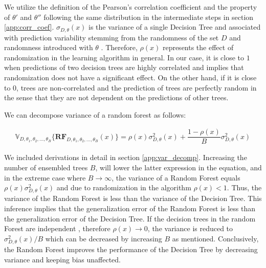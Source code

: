 We utilize the definition of the Pearson's correlation coefficient and the property of $\theta'$ and $\theta''$ following 
the same distribution in the intermediate steps in section \ref{app:corr_coef}. 
$\sigma_{D, \theta}(x)$ is the variance of a single Decision Tree and 
associated with prediction variability stemming from the randomness of the set $D$ 
and randomness introduced with $\theta$ \cite{louppe2014understanding}.
Therefore, $\rho(x)$ represents the effect of randomization in the learning algorithm in general.
In our case, it is close to $1$ when predictions of two decision trees are highly correlated and implies that randomization 
does not have a significant effect. 
On the other hand, if it is close to 0, trees are non-correlated and 
the prediction of trees are perfectly random in the sense that they are
not dependent on the predictions of other trees. 

We can decompose variance of a random forest as follows:

\begin{align}\label{eq:decomp_var}
\mathbb{V}_{D, \theta_{1}, \theta_{2},..., \theta_{B}}\{\boldsymbol{RF}_{D, \theta_{1},\theta_{2},..., \theta_{B}}(x) \}  = \rho(x)\sigma^2_{D,\theta}(x) + \dfrac{1-\rho(x)}{B}\sigma^2_{D,\theta}(x)
\end{align}

We included derivations in detail in section \ref{app:var_decomp}. 
Increasing the number of ensembled trees $B$, will lower the latter expression in the equation, and in the extreme 
case where $B \rightarrow \infty $, the variance of a Random Forest equals  $\rho(x)\sigma^2_{D,\theta}(x)$ 
and due to randomization in the algorithm $\rho(x) < 1$.
Thus, the variance of the Random Forest is less than the variance of the Decision Tree. 
This inference implies that the generalization error of the Random Forest is less 
than the generalization error of the Decision Tree. 
If the decision trees in the random Forest are independent 
, therefore $\rho(x) \rightarrow 0$, the variance is reduced to $\sigma^2_{D,\theta}(x)/B$ 
which can be decreased by increasing $B$ as mentioned. 
Conclusively, the Random Forest improves the performance of the Decision Tree by decreasing variance 
and keeping bias unaffected.

